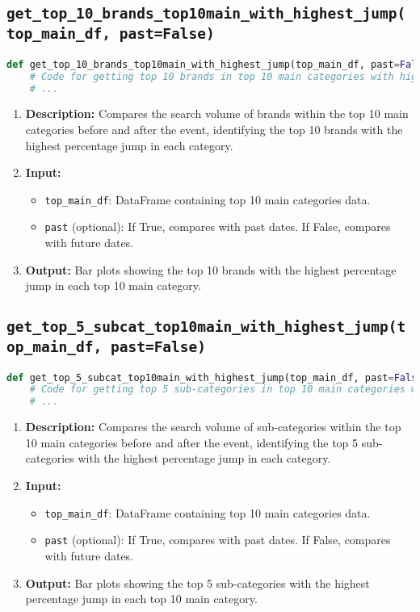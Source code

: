 \subsection{\texttt{get\_top\_10\_brands\_top10main\_with\_highest\_jump(top\_main\_df, past=False)}}
\begin{lstlisting}[language=Python]
def get_top_10_brands_top10main_with_highest_jump(top_main_df, past=False):
    # Code for getting top 10 brands in top 10 main categories with highest jump
    # ...

\end{lstlisting}
\begin{enumerate}
    \item \textbf{Description:} Compares the search volume of brands within the top 10 main categories before and after the event, identifying the top 10 brands with the highest percentage jump in each category.
    \item \textbf{Input:}
          \begin{itemize}
              \item \texttt{top\_main\_df}: DataFrame containing top 10 main categories data.
              \item \texttt{past} (optional): If True, compares with past dates. If False, compares with future dates.
          \end{itemize}
    \item \textbf{Output:} Bar plots showing the top 10 brands with the highest percentage jump in each top 10 main category.
\end{enumerate}

\subsection{\texttt{get\_top\_5\_subcat\_top10main\_with\_highest\_jump(top\_main\_df, past=False)}}
\begin{lstlisting}[language=Python]
def get_top_5_subcat_top10main_with_highest_jump(top_main_df, past=False):
    # Code for getting top 5 sub-categories in top 10 main categories with highest jump
    # ...

\end{lstlisting}
\begin{enumerate}
    \item \textbf{Description:} Compares the search volume of sub-categories within the top 10 main categories before and after the event, identifying the top 5 sub-categories with the highest percentage jump in each category.
    \item \textbf{Input:}
          \begin{itemize}
              \item \texttt{top\_main\_df}: DataFrame containing top 10 main categories data.
              \item \texttt{past} (optional): If True, compares with past dates. If False, compares with future dates.
          \end{itemize}
    \item \textbf{Output:} Bar plots showing the top 5 sub-categories with the highest percentage jump in each top 10 main category.
\end{enumerate}

